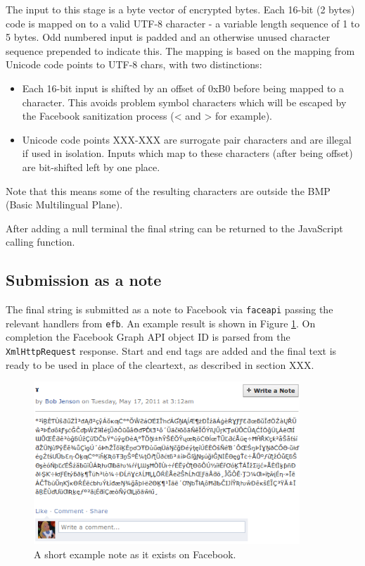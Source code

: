 The input to this stage is a byte vector of encrypted bytes. Each 16-bit (2 bytes) code is mapped on to a valid UTF-8 character - a variable length sequence of 1 to 5 bytes. Odd numbered input is padded and an otherwise unused character sequence prepended to indicate this. The mapping is based on the mapping from Unicode code points to UTF-8 chars, with two distinctions:

\begin{itemize}

    \item Each 16-bit input is shifted by an offset of 0xB0 before being mapped to a character. This avoids problem symbol characters which will be escaped by the Facebook sanitization process (< and > for example).
    
    \item Unicode code points XXX-XXX are surrogate pair characters and are illegal if used in isolation. Inputs which map to these characters (after being offset) are bit-shifted left by one place.
    
\end{itemize}


Note that this means some of the resulting characters are outside the BMP (Basic Multilingual Plane).

After adding a null terminal the final string can be returned to the JavaScript calling function.


\FloatBarrier
\subsection{Submission as a note}
\label{ssec:submitnote}

The final string is submitted as a note to Facebook via {\tt faceapi} passing the relevant handlers from {\tt efb}. An example result is shown in Figure \ref{scn:note}. On completion the Facebook Graph API object ID is parsed from the {\tt XmlHttpRequest} response.  Start and end tags are added and the final text is ready to be used in place of the cleartext, as described in section XXX.

    \begin{figure}[tbph]
        \begin{center}
                \includegraphics[width=10cm]{screens/note.png}
            \caption{A short example note as it exists on Facebook.}
            \label{scn:note}
        \end{center}
    \end{figure}

